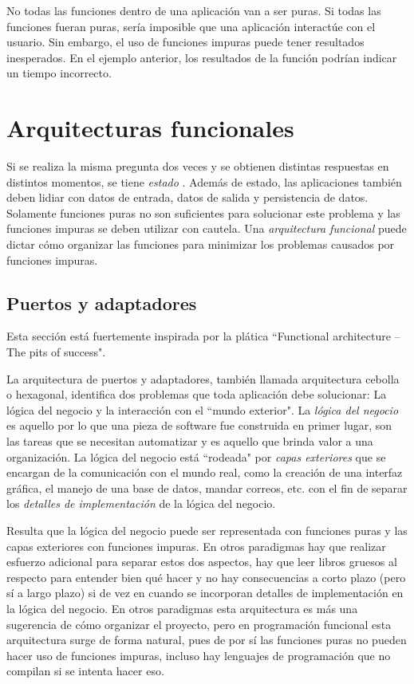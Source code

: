 \documentclass{article}
\newcommand{\codejs}[1]{\tcbox{\lstinline[style=ES6]{#1}}}
\begin{document}
No todas las funciones dentro de una aplicación van a ser puras. Si todas las funciones fueran puras, sería imposible que una aplicación interactúe con el usuario. Sin embargo, el uso de funciones impuras puede tener resultados inesperados. En el ejemplo anterior, los resultados de la función \codejs{memoize( process )} podrían indicar un tiempo incorrecto.


\section{Arquitecturas funcionales}
Si se realiza la misma pregunta dos veces y se obtienen distintas respuestas en distintos momentos, se tiene \textit{estado} \cite{persistent-data-structures}. Además de estado, las aplicaciones también deben lidiar con datos de entrada, datos de salida y persistencia de datos. Solamente funciones puras no son suficientes para solucionar este problema y las funciones impuras se deben utilizar con cautela. Una \textit{arquitectura funcional} puede dictar cómo organizar las funciones para minimizar los problemas causados por funciones impuras. 


\subsection{Puertos y adaptadores}
Esta sección está fuertemente inspirada por la plática ``Functional architecture – The pits of success"\cite{functional-architecture}.

La arquitectura de puertos y adaptadores, también llamada arquitectura cebolla o hexagonal, identifica dos problemas que toda aplicación debe solucionar: La lógica del negocio y la interacción con el ``mundo exterior". La \textit{lógica del negocio} es aquello por lo que una pieza de software fue construida en primer lugar, son las tareas que se necesitan automatizar y es aquello que brinda valor a una organización. La lógica del negocio está ``rodeada" por \textit{capas exteriores} que se encargan de la comunicación con el mundo real, como la creación de una interfaz gráfica, el manejo de una base de datos, mandar correos, etc. con el fin de separar los \textit{detalles de implementación} de la lógica del negocio.

Resulta que la lógica del negocio puede ser representada con funciones puras y las capas exteriores con funciones impuras. En otros paradigmas hay que realizar esfuerzo adicional para separar estos dos aspectos, hay que leer libros gruesos al respecto para entender bien qué hacer y no hay consecuencias a corto plazo (pero sí a largo plazo) si de vez en cuando se incorporan detalles de implementación en la lógica del negocio. En otros paradigmas esta arquitectura es más una sugerencia de cómo organizar el proyecto, pero en programación funcional esta arquitectura surge de forma natural, pues de por sí las funciones puras no pueden hacer uso de funciones impuras, incluso hay lenguajes de programación que no compilan si se intenta hacer eso.
\end{document}
